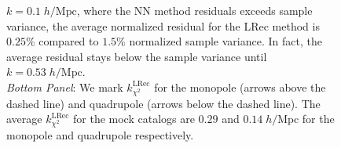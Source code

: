 \begin{figure}
\begin{center}
{                                                                                                                                                                                                                                                                         $k = 0.1 \;h/\mathrm{Mpc}$, where the NN method residuals exceeds sample 
                                                                                                                                                                                                                                                                         variance, the average normalized residual for the LRec method is $0.25\%$ 
                                                                                                                                                                                                                                                                         compared to $1.5\%$ normalized sample variance. In fact, the average 
                                                                                                                                                                                                                                                                         residual stays below the sample variance until $k = 0.53\;h/\mathrm{Mpc}$.\\
                                                                                                                                                                                                                                                                         {\it Bottom Panel}: We mark $k^\mathrm{LRec}_{\chi^2}$ for the monopole (arrows above the 
                                                                                                                                                                                                                                                                         dashed line) and quadrupole (arrows below the dashed line). 
                                                                                                                                                                                                                                                                         The average $k^\mathrm{LRec}_{\chi^2}$ for the mock catalogs
                                                                                                                                                                                                                                                                         are $0.29$ and $0.14\;h/\mathrm{Mpc}$ for the monopole and quadrupole respectively. 
}
\end{center}
\end{figure}
